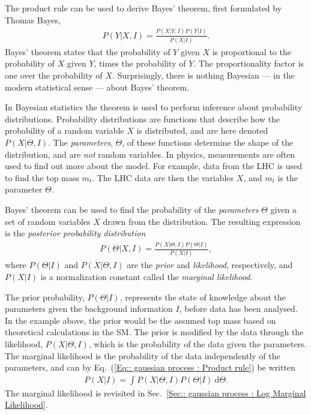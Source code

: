 \documentclass[twoside,english]{uiofysmaster}
\begin{document}
{{The product rule can be used to derive Bayes' theorem, first formulated by Thomas Bayes,
\begin{align}\label{Eq:: gaussian process : Bayes theorem}
P(Y | X, I) = \frac{P(X | Y, I)  P(Y | I)}{P(X | I)}.
\end{align}
Bayes' theorem states that the probability of $Y$ given $X$ is proportional to the probability of $X$ given $Y$, times the probability of $Y$. The proportionality factor is one over the probability of $X$. Surprisingly, there is nothing Bayesian --- in the modern statistical sense ---  about Bayes' theorem.  

In Bayesian statistics the theorem is used to perform inference about probability distributions. Probability distributions are functions that describe how the probability of a random variable $X$ is distributed, and are here denoted $P(X| \Theta, I)$. The \textit{parameters}, $\Theta$, of these functions determine the shape of the distribution, and are \textit{not} random variables. In physics, measurements are often used to find out more about the model. For example, data from the LHC is used to find the top mass $m_t$. The LHC data are then the variables $X$, and $m_t$ is the parameter $\Theta$. 

Bayes' theorem can be used to find the probability of the \textit{parameters} $\Theta$ given a set of random variables  $X$ drawn from the distribution. The resulting expression is the \textit{posterior probability distribution}
\begin{align}\label{Eq:: gaussian process : Bayesian inference}
P(\Theta | X , I) = \frac{P(X|\Theta, I) P(\Theta| I)}{P(X | I)},
\end{align}
where $P(\Theta | I)$  and $P(X |\Theta, I)$ are the \textit{prior} and \textit{likelihood}, respectively, and $P(X|I)$ is a normalization constant called the \textit{marginal likelihood}. 

The prior probability, $P(\Theta | I)$, represents the state of knowledge about the parameters given the background information $I$, before data has been analysed. In the example above, the prior would be the assumed top mass based on theoretical calculations in the SM. The prior is modified by the data through the likelihood, $P(X |\Theta, I)$, which is the probability of the data given the parameters.  The marginal likelihood is the probability of the data independently of the parameters, and can by Eq.~(\ref{Eq:: gaussian process : Product rule}) be written
\begin{align}
P(X|I) = \int P(X| \Theta, I) P(\Theta | I)~ \text{d} \Theta.
\end{align}
The marginal likelihood is revisited in Sec.~\ref{Sec:: gaussian process : Log Marginal Likelihood}.

}}
\end{document}
